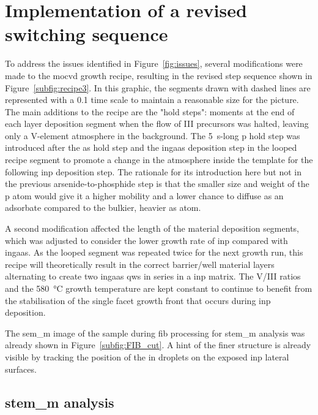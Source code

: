\section{Implementation of a revised switching sequence}
To address the issues identified in Figure~\ref{fig:issues}, several modifications were made to the \acs{mocvd} growth recipe, resulting in the revised step sequence shown in Figure~\ref{subfig:recipe3}. In this graphic, the segments drawn with dashed lines are represented with a \num{0.1} time scale to maintain a reasonable size for the picture. The main additions to the recipe are the "hold steps": moments at the end of each layer deposition segment when the flow of III precursors was halted, leaving only a V-element atmosphere in the background. The \qty{5}{s}-long \acl{p} hold step was introduced after the \acl{as} hold step and the \acs{ingaas} deposition step in the looped recipe segment to promote a change in the atmosphere inside the template for the following \acs{inp} deposition step. The rationale for its introduction here but not in the previous arsenide-to-phosphide step is that the smaller size and weight of the \acl{p} atom would give it a higher mobility and a lower chance to diffuse as an adsorbate compared to the bulkier, heavier \acl{as} atom. 

A second modification affected the length of the material deposition segments, which was adjusted to consider the lower growth rate of \acs{inp} compared with \acs{ingaas}. As the looped segment was repeated twice for the next growth run, this recipe will theoretically result in the correct barrier/well material layers alternating to create two \acs{ingaas} \acl{qw}s in series in a \acs{inp} matrix. The V/III ratios and the \qty{580}{\degreeCelsius} growth temperature are kept constant to continue to benefit from the stabilisation of the single  facet growth front that occurs during \acs{inp} deposition.

The \acs{sem_m} image of the sample during \acs{fib} processing for \acs{stem_m} analysis was already shown in Figure~\ref{subfig:FIB_cut}. A hint of the finer structure is already visible by tracking the position of the \acl{in} droplets on the exposed \acs{inp} lateral surfaces.

\subsection{\texorpdfstring{\acs{stem_m} analysis}{STEM analysis}}

